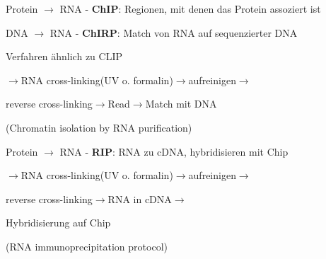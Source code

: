 Protein $\rightarrow$ RNA - \textbf{ChIP}: Regionen, mit denen das Protein assoziert ist

DNA $\rightarrow$ RNA - \textbf{ChIRP}: Match von RNA auf sequenzierter DNA

\hspace{47mm}Verfahren ähnlich zu CLIP

\hspace{47mm}$\rightarrow$RNA cross-linking(UV o. formalin)$\rightarrow$aufreinigen$\rightarrow$

\hspace{47mm}reverse cross-linking$\rightarrow$Read$\rightarrow$Match mit DNA

\hspace{47mm}(Chromatin isolation by RNA purification)

Protein $\rightarrow$ RNA - \textbf{RIP}: RNA zu cDNA, hybridisieren mit Chip

\hspace{47mm}$\rightarrow$RNA cross-linking(UV o. formalin)$\rightarrow$aufreinigen$\rightarrow$

\hspace{47mm}reverse cross-linking$\rightarrow$RNA in cDNA$\rightarrow$

\hspace{47mm}Hybridisierung auf Chip

\hspace{47mm}(RNA immunoprecipitation protocol)